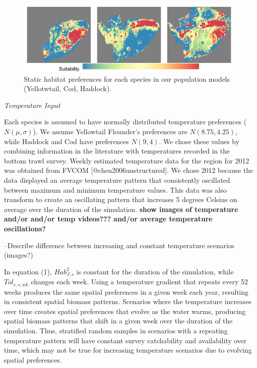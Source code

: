 \documentclass[
]{article}
\begin{document}
\begin{figure}

{\centering \includegraphics[width=0.95\linewidth]{Images/Habitat_3species} 

}

\caption{Static habitat preferences for each species in our population models (Yellotwtail, Cod, Haddock).}\label{fig:hab-plot}
\end{figure}

\emph{Temperature Input}

Each species is assumed to have normally distributed temperature preferences (\(N(\mu,\sigma)\)). We assume Yellowtail Flounder's preferences are \(N(8.75,4.25)\), while Haddock and Cod have preferences \(N(9,4)\). We chose these values by combining information in the literature with temperatures recorded in the bottom trawl survey. Weekly estimated temperature data for the region for 2012 was obtained from FVCOM {[}@chen2006unstructured{]}. We chose 2012 because the data displayed an average temperature pattern that consistently oscillated between maximum and minimum temperature values. This data was also transform to create an oscillating pattern that increases 5 degrees Celsius on average over the duration of the simulation. \textbf{show images of temperature and/or and/or temp videos??? and/or average temperature oscillations?}

--Describe difference between increasing and constant temperature scenarios (images?)

In equation (1), \(Hab^2_{J,s}\) is constant for the duration of the simulation, while \(Tol_{c,s,wk}\) changes each week. Using a temperature gradient that repeats every 52 weeks produces the same spatial preferences in a given week each year, resulting in consistent spatial biomass patterns. Scenarios where the temperature increases over time creates spatial preferences that evolve as the water warms, producing spatial biomass patterns that shift in a given week over the duration of the simulation. Thus, stratified random samples in scenarios with a repeating temperature pattern will have constant survey catchability and availability over time, which may not be true for increasing temperature scenarios due to evolving spatial preferences.
\end{document}
